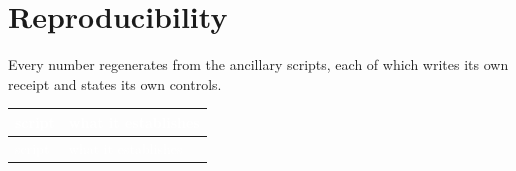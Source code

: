 \documentclass[11pt,a4paper]{article}
\theoremstyle{definition}
\begin{document}
\appendix
\section{Reproducibility}\label{app:repro}
Every number regenerates from the ancillary scripts, each of which writes its own receipt and states
its own controls.

{\small
\begin{longtable}{p{5.4cm}p{9.4cm}}
\toprule
\rowcolor{hdrblue}
\textcolor{white}{script} & \textcolor{white}{what it establishes}\\
\midrule
\endfirsthead
\toprule
\rowcolor{hdrblue}
\textcolor{white}{script} & \textcolor{white}{what it establishes}\\
\midrule
\endhead


\end{longtable}}
\end{document}
